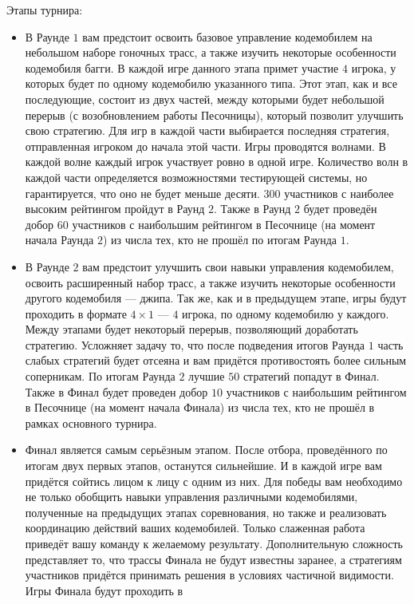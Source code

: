 Этапы турнира:
\begin{itemize}
  \item В Раунде $1$ вам предстоит освоить базовое управление кодемобилем на небольшом наборе гоночных трасс, а также изучить некоторые
        особенности кодемобиля багги. В каждой игре данного этапа примет участие $4$ игрока, у которых будет по одному кодемобилю указанного
        типа. Этот этап, как и все последующие, состоит из двух частей, между которыми будет небольшой перерыв (с возобновлением работы
        Песочницы), который позволит улучшить свою стратегию. Для игр в каждой части выбирается последняя стратегия, отправленная игроком до
        начала этой части. Игры проводятся волнами. В каждой волне каждый игрок участвует ровно в одной игре. Количество волн в каждой части
        определяется возможностями тестирующей системы, но гарантируется, что оно не будет меньше десяти. $300$ участников с наиболее
        высоким рейтингом пройдут в Раунд $2$. Также в Раунд $2$ будет проведён добор $60$ участников с наибольшим рейтингом в Песочнице (на
        момент начала Раунда $2$) из числа тех, кто не прошёл по итогам Раунда $1$.
  \item В Раунде $2$ вам предстоит улучшить свои навыки управления кодемобилем, освоить расширенный набор трасс, а также изучить некоторые
        особенности другого кодемобиля --- джипа. Так же, как и в предыдущем этапе, игры будут проходить в формате $4\times1$ --- $4$
        игрока, по одному кодемобилю у каждого. Между этапами будет некоторый перерыв, позволяющий доработать стратегию. Усложняет задачу
        то, что после подведения итогов Раунда $1$ часть слабых стратегий будет отсеяна и вам придётся противостоять более сильным
        соперникам. По итогам Раунда $2$ лучшие $50$ стратегий попадут в Финал. Также в Финал будет проведен добор $10$ участников с
        наибольшим рейтингом в Песочнице (на момент начала Финала) из числа тех, кто не прошёл в рамках основного турнира.
  \item Финал является самым серьёзным этапом. После отбора, проведённого по итогам двух первых этапов, останутся сильнейшие. И в каждой
        игре вам придётся сойтись лицом к лицу с одним из них. Для победы вам необходимо не только обобщить навыки управления различными
        кодемобилями, полученные на предыдущих этапах соревнования, но также и реализовать координацию действий ваших кодемобилей. Только
        слаженная работа приведёт вашу команду к желаемому результату. Дополнительную сложность представляет то, что трассы Финала не будут
        известны заранее, а стратегиям участников придётся принимать решения в условиях частичной видимости. Игры Финала будут проходить в

\end{itemize}
